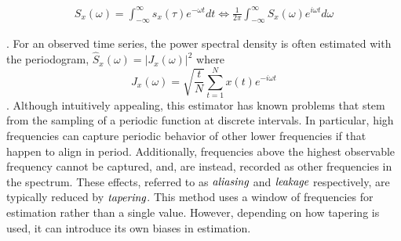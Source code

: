 \documentclass{stat572Style}
\begin{document}
\begin{align*}
S_{x}(\omega) = \int_{-\infty}^{\infty}s_{x}(\tau) e^{-\omega t}dt  \Longleftrightarrow \frac{1}{2\pi} \int_{-\infty}^{\infty}S_{x}(\omega) e^{i \omega t} d\omega 
\end{align*}

\noindent \citep{Sykulski2013}. For an observed time series, the power spectral density is often estimated with the periodogram, $\hat{S}_{x}(\omega) = |J_{x}(\omega)|^{2}$ where 
\begin{equation}
J_{x}(\omega) = \sqrt{\frac{t}{N}} \sum_{t=1}^{N} x(t) e^{-i \omega t}
\end{equation}
\citep{Sykulski2013}. Although intuitively appealing, this estimator has known problems that stem from the sampling of a periodic function at discrete intervals. In particular,  high frequencies can  capture periodic behavior of other lower frequencies if that happen to align in period. Additionally, frequencies above the highest observable frequency cannot be captured, and, are instead, recorded as other frequencies in the spectrum.  These effects, referred to as $\textbf{\it{aliasing}}$ and $\textbf{\it{leakage}}$ respectively,  are typically reduced by $\textbf{\it{tapering}}$. This method uses  a window of frequencies for estimation rather than a single value. However, depending on how tapering is used, it can introduce its own  biases in estimation.  


\end{document}
